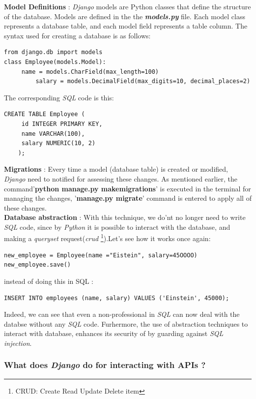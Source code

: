 \documentclass[12pt,a4paper]{report}
\begin{document}
\textbf{Model Definitions} : \textit{Django} models are Python classes that define the structure of the database. Models are defined in the the \textbf{\textit{models.py}} file. Each model class represents a database table, and each model field represents a table column. The syntax used for creating a database is as follows: 
\begin{lstlisting}[style=stylepython]
from django.db import models
class Employee(models.Model):
     name = models.CharField(max_length=100)
	     salary = models.DecimalField(max_digits=10, decimal_places=2)
\end{lstlisting} 
The corresponding \textit{SQL} code is this:  
\begin{lstlisting}[style=stylepython]
	CREATE TABLE Employee (
	 id INTEGER PRIMARY KEY,
	 name VARCHAR(100),
	 salary NUMERIC(10, 2)
	);
\end{lstlisting}  

 \textbf{Migrations} : Every time a model (database table) is created or modified, \textit{Django} need to notified for assessing these changes. As mentioned earlier, the command'\textbf{python manage.py makemigrations}' is executed in the terminal for managing the changes,  '\textbf{manage.py migrate}' command is entered to apply all of these changes.   \\
 
\textbf{ Database abstraction} : With this technique, we do'nt no longer need to write \textit{SQL} code, since by \textit{Python} it is possible to interact with the database, and making a \textit{queryset} request(\textit{crud}  \footnote{CRUD: Create Read Update Delete item}).Let's see how it works once again: 

\begin{lstlisting}[style=stylepython]
new_employee = Employee(name ="Eistein", salary=45OOOO) 
new_employee.save()
\end{lstlisting} 
instead of doing this in SQL : 
\begin{lstlisting}[style=stylepython]
INSERT INTO employees (name, salary) VALUES ('Einstein', 45000);
\end{lstlisting}  

Indeed, we can see that even a non-professional in \textit{SQL} can now deal with the databse without any \textit{SQL} code. \newline
Furhermore, the use of abstraction techniques to interact with database, enhances its security of by guarding against \textit{SQL injection}. 
\subsubsection{What does \textit{Django} do for interacting with APIs ?}
\end{document}
